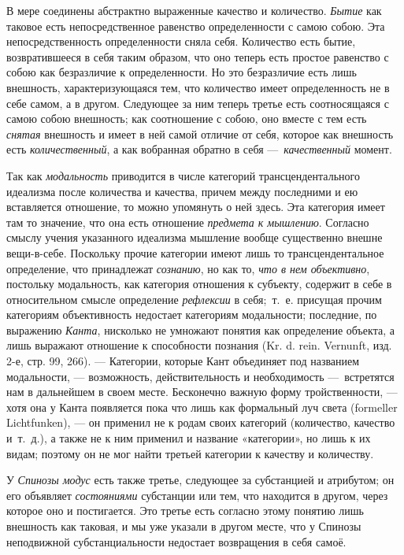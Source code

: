 
В мере соединены абстрактно выраженные качество
и количество. {\em Бытие} как таковое есть
непосредственное равенство определенности с самою собою. Эта
непосредственность определенности сняла себя. Количество есть бытие,
возвратившееся в себя таким образом, что оно теперь есть простое равенство
с собою как безразличие к определенности. Но это безразличие есть лишь
внешность, характеризующаяся тем, что количество имеет определенность не в
себе самом, а в другом. Следующее за ним теперь третье есть соотносящаяся с
самою собою внешность; как соотношение с собою, оно вместе с тем есть
{\em снятая} внешность и имеет в ней самой отличие от
себя, которое как внешность есть {\em количественный},
а как вобранная обратно в себя —~{\em качественный}
момент.

Так как {\em модальность} приводится в числе категорий
трансцендентального идеализма после количества и качества, причем между
последними и ею вставляется отношение, то можно упомянуть о ней здесь. Эта
категория имеет там то значение, что она есть отношение
{\em предмета к мышлению}. Согласно смыслу учения
указанного идеализма мышление вообще существенно внешне вещи-в-себе.
Поскольку прочие категории имеют лишь то трансцендентальное определение,
что принадлежат {\em сознанию}, но как то,
{\em что в нем объективно}, постольку модальность, как
категория отношения к субъекту, содержит в себе в относительном смысле
определение {\em рефлексии} в себя;~т.~е. присущая
прочим категориям объективность недостает категориям модальности;
последние, по выражению {\em Канта}, нисколько не
умножают понятия как определение объекта, а лишь выражают отношение к
способности познания (Kr. d. rein. Vernunft, изд. 2-е, стр. 99, 266). —
Категории, которые Кант объединяет под названием модальности, —
возможность, действительность и необходимость —~встретятся нам в дальнейшем
в своем месте. Бесконечно важную форму тройственности, — хотя она у Канта
появляется пока что лишь как формальный луч света (formeller Lichtfunken),
— он применил не к родам своих категорий (количество, качество и~т.~д.), а
также не к ним применил и название «категории», но лишь к их видам; поэтому
он не мог найти третьей категории к качеству и количеству.

У {\em Спинозы модус} есть
также третье, следующее за субстанцией и атрибутом; он его объявляет
{\em состояниями} субстанции или тем, что находится в
другом, через которое оно и постигается. Это третье есть согласно этому
понятию лишь внешность как таковая, и мы уже указали в другом месте, что у
Спинозы неподвижной субстанциальности недостает возвращения в себя самоё.

